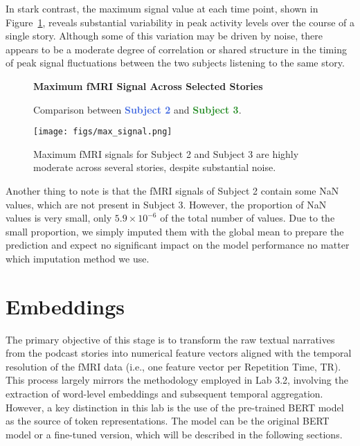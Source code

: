 \documentclass[10pt,letterpaper]{article}
\begin{document}
In stark contrast, the maximum signal value at each time point, shown in Figure~\ref{fig:max_signal}, reveals substantial variability in peak activity levels over the course of a single story. Although some of this variation may be driven by noise, there appears to be a moderate degree of correlation or shared structure in the timing of peak signal fluctuations between the two subjects listening to the same story.

\begin{figure}[ht]
    \centering
    \parbox{\textwidth}{\centering 
        \fontsize{13pt}{13pt}\selectfont \textbf{Maximum fMRI Signal Across Selected Stories}  

        {\fontsize{11pt}{13pt}\selectfont Comparison between \textcolor{RoyalBlue}{\textbf{Subject 2}} and \textcolor{ForestGreen}{\textbf{Subject 3}}.} 
    }
    \texttt{[image: figs/max\_signal.png]}
    \caption{Maximum fMRI signals for Subject 2 and Subject 3 are highly moderate across several stories, despite substantial noise.}
    \label{fig:max_signal}
\end{figure}

Another thing to note is that the fMRI signals of Subject 2 contain some NaN values, which are not present in Subject 3. However, the proportion of NaN values is very small, only \(5.9 \times 10^{-6}\) of the total number of values. Due to the small proportion, we simply imputed them with the global mean to prepare the prediction and expect no significant impact on the model performance no matter which imputation method we use.


\section{Embeddings}

The primary objective of this stage is to transform the raw textual narratives from the podcast stories into numerical feature vectors aligned with the temporal resolution of the fMRI data (i.e., one feature vector per Repetition Time, TR). This process largely mirrors the methodology employed in Lab 3.2, involving the extraction of word-level embeddings and subsequent temporal aggregation. However, a key distinction in this lab is the use of the pre-trained BERT model \cite{devlin2019bert} as the source of token representations. The model can be the original BERT model or a fine-tuned version, which will be described in the following sections.
\end{document}
